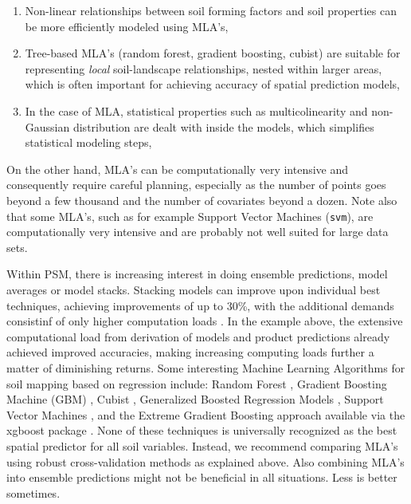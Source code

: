 \documentclass[graybox,natbib,nospthms,UStrade]{svmono}
\providecommand{\tightlist}{%
  \setlength{\itemsep}{0pt}\setlength{\parskip}{0pt}}
\providecommand{\tightlist}{\setlength{\itemsep}{0pt}\setlength{\parskip}{0pt}}
\begin{document}
\begin{enumerate}
\def\labelenumi{\arabic{enumi}.}
\tightlist
\item
  Non-linear relationships between soil forming factors and soil properties can be more efficiently modeled using MLA's,
\item
  Tree-based MLA's (random forest, gradient boosting, cubist) are suitable for representing \emph{local} soil-landscape relationships, nested within larger areas, which is often important for achieving accuracy of spatial prediction models,
\item
  In the case of MLA, statistical properties such as multicolinearity and non-Gaussian distribution are dealt with inside the models, which simplifies statistical modeling steps,
\end{enumerate}

On the other hand, MLA's can be computationally very intensive and consequently require careful planning, especially as the number of points goes beyond a few thousand and the number of covariates beyond a dozen. Note also that some MLA's, such as for example Support Vector Machines (\texttt{svm}), are computationally very intensive and are probably not well suited for large data sets.

Within PSM, there is increasing interest in doing ensemble predictions,
model averages or model stacks. Stacking models can improve upon
individual best techniques, achieving improvements of up to 30\%, with
the additional demands consistinf of only higher computation loads
\citep{michailidis2017investigating}. In the example above, the extensive
computational load from derivation of models and product predictions
already achieved improved accuracies, making increasing computing loads
further a matter of diminishing returns. Some interesting Machine Learning Algorithms for soil mapping based on regression include: Random Forest \citep{Biau2016},
Gradient Boosting Machine (GBM) \citep{hastie2009elements}, Cubist \citep{kuhn2014cubist},
Generalized Boosted Regression Models \citep{ridgeway2010gbm}, Support Vector Machines \citep{chang2011libsvm},
and the Extreme Gradient Boosting approach available via the xgboost package \citep{2016arXiv160302754C}.
None of these techniques is universally recognized as the best spatial predictor for all soil variables.
Instead, we recommend comparing MLA's using robust cross-validation methods as explained above.
Also combining MLA's into ensemble predictions might not be beneficial in all situations.
Less is better sometimes.
\end{document}

